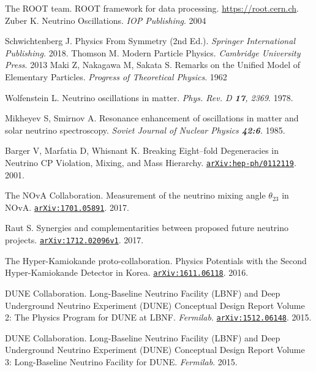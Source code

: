 \begin{thebibliography}{100}

	 The ROOT team. ROOT framework for data processing.
		\url{https://root.cern.ch}.
	 Zuber K. Neutrino
		Oscillations. \textit{IOP Publishing}. 2004

	 Schwichtenberg J. Physics From Symmetry (2nd Ed.).
		\textit{Springer International Publishing.} 2018.
	 Thomson M. Modern Particle Physics. \textit{Cambridge
		University Press}. 2013
	 Maki Z, Nakagawa M, Sakata S. Remarks on the Unified Model of
		Elementary Particles. \textit{Progress of Theoretical Physics}. 1962

	 Wolfenstein L. Neutrino oscillations in matter.
		\textit{Phys. Rev. D \textbf{17}, 2369}. 1978.

	 Mikheyev S, Smirnov A. Resonance enhancement of
		oscillations in matter and solar neutrino spectroscopy. \textit{Soviet
		Journal of Nuclear Physics \textbf{42:6}.} 1985.

	 Barger V, Marfatia D, Whisnant K. Breaking Eight–fold
		Degeneracies in Neutrino CP Violation, Mixing, and Mass Hierarchy.
		\href{https://arxiv.org/abs/hep-ph/0112119}{\texttt{arXiv:hep-ph/0112119}}.
		2001.

	 The NOvA Collaboration. Measurement of the neutrino mixing
		angle $\theta_{23}$ in NOvA.
		\href{https://arxiv.org/abs/1701.05891}{\texttt{arXiv:1701.05891}}. 2017.

	 Raut S. Synergies and complementarities between proposed
		future neutrino projects.
		\href{https://arxiv.org/abs/1712.02096v1}{\texttt{arXiv:1712.02096v1}}.
		2017.

	 The Hyper-Kamiokande proto-collaboration. Physics Potentials
		with the Second Hyper-Kamiokande Detector in Korea.
		\href{https://arxiv.org/abs/1611.06118}{\texttt{arXiv:1611.06118}}. 2016.


	 DUNE Collaboration. Long-Baseline Neutrino Facility (LBNF) and
		Deep Underground Neutrino Experiment (DUNE) Conceptual Design Report Volume
		2: The Physics Program for DUNE at LBNF. \textit{Fermilab}.
		\href{https://arxiv.org/abs/1512.06148}{\texttt{arXiv:1512.06148}}. 2015.

	 DUNE Collaboration. Long-Baseline Neutrino Facility (LBNF)
		and Deep Underground Neutrino Experiment (DUNE) Conceptual Design Report
		Volume 3: Long-Baseline Neutrino Facility for DUNE. \textit{Fermilab}. 2015.



\end{thebibliography}
